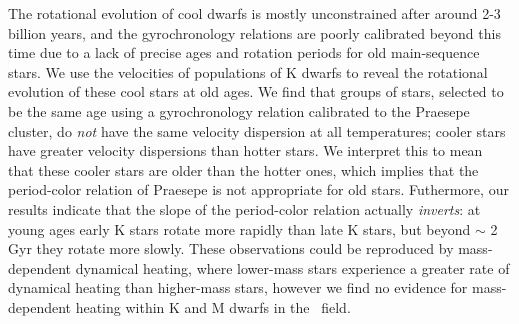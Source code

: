 
The rotational evolution of cool dwarfs is mostly unconstrained after around
2-3 billion years, and the gyrochronology relations are poorly calibrated
beyond this time due to a lack of precise ages and rotation periods for old
main-sequence stars.
We use the velocities of populations of K dwarfs to reveal the rotational
evolution of these cool stars at old ages.
We find that groups of stars, selected to be the same age using a
gyrochronology relation calibrated to the Praesepe cluster, do {\it not} have
the same velocity dispersion at all temperatures; cooler stars have greater
velocity dispersions than hotter stars.
We interpret this to mean that these cooler stars are older than the hotter
ones, which implies that the period-color relation of Praesepe is not
appropriate for old stars.
Futhermore, our results indicate that the slope of the period-color relation
actually {\it inverts}: at young ages early K stars rotate more rapidly than
late K stars, but beyond $\sim$ 2 Gyr they rotate more slowly.
These observations could be reproduced by mass-dependent dynamical heating,
where lower-mass stars experience a greater rate of dynamical heating than
higher-mass stars, however we find no evidence for mass-dependent heating
within K and M dwarfs in the \kepler\ field.


